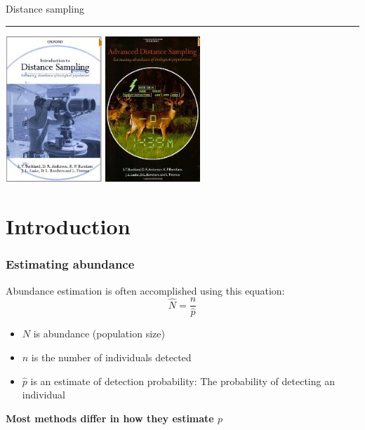 \documentclass[color=usenames,dvipsnames]{beamer}\usepackage[]{graphicx}\usepackage[]{color}
\begin{document}
\begin{frame}[plain]
  \begin{center}
    {\huge Distance sampling \par}
    \vspace{0.5cm}
    {\color{RoyalBlue} \rule{\textwidth}{1pt}}
    \vfill
    \includegraphics[height=5.5cm,keepaspectratio]{figs/book1} %
    \hspace{0.5cm}
      \includegraphics[height=5.5cm,keepaspectratio,trim = 0mm
        0mm 0mm 0mm, clip]{figs/book2}
  \end{center}
\end{frame}




\section{Introduction}



\begin{frame}
  \frametitle{Estimating abundance}
  \large
  Abundance estimation is often accomplished using this equation:
  \[
    \hat{N} = \frac{n}{\hat{p}}
  \]
  \begin{itemize}
    \item $N$ is abundance (population size)
    \item $n$ is the number of individuals detected
    \item $\hat{p}$ is an estimate of detection probability: The probability
      of detecting an individual
  \end{itemize}
  \pause
  \vfill
  \centering
  \bf
  Most methods differ in how they estimate $p$ \\
\end{frame}
\end{document}
